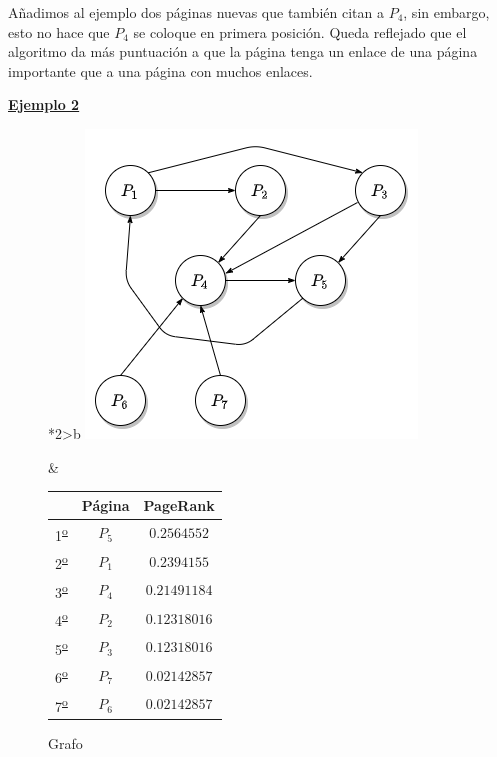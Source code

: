 \documentclass[size=a4, parskip=half, titlepage=false, toc=flat, toc=bib, 12pt]{scrartcl}
\theoremstyle{theorem-style}
\theoremstyle{definition-style}
\theoremstyle{remark-style}
\theoremstyle{example-style}
\theoremstyle{definition-style}
\theoremstyle{remark-style}
\begin{document}
Añadimos al ejemplo dos páginas nuevas que también citan a $P_4$, sin embargo, esto no hace que $P_4$ se coloque en primera posición. Queda reflejado que el algoritmo da más puntuación a que la página tenga un enlace de una página importante que a una página con muchos enlaces.

\underline{\textbf{Ejemplo 2}}

\begin{figure}[!ht]
  \begin{tabular}{*{2}{>{\centering\arraybackslash}b{}}}
  \centering
    \includegraphics[scale=0.5]{./img/grafoej2}
    \caption{Grafo}
    &
      \renewcommand{\arraystretch}{1.3}
      \begin{tabular}{ccc}
        & Página & PageRank     \\ \hline
      1\textsuperscript{\underline{o}}} & $P_5$  & $0.2564552$  \\ \hline
      2\textsuperscript{\underline{o}}} & $P_1$  & $0.2394155$  \\ \hline
      3\textsuperscript{\underline{o}}} & $P_4$  & $0.21491184$ \\ \hline
      4\textsuperscript{\underline{o}}} & $P_2$  & $0.12318016$ \\ \hline
      5\textsuperscript{\underline{o}}} & $P_3$  & $0.12318016$ \\ \hline
      6\textsuperscript{\underline{o}}} & $P_7$  & $0.02142857$ \\ \hline
      7\textsuperscript{\underline{o}}} & $P_6$  & $0.02142857$ \\ \hline
      \end{tabular}
    \end{tabular}
\end{figure}
\end{document}

